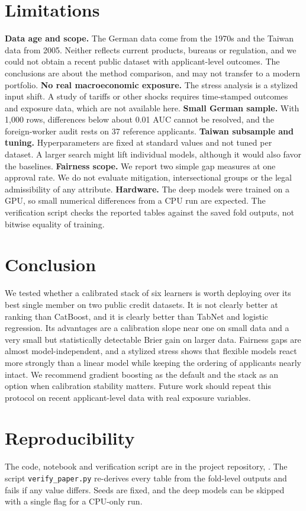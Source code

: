 \section{Limitations}\label{sec:limits}
\textbf{Data age and scope.} The German data come from the 1970s and the Taiwan data from 2005. Neither reflects current products, bureaus or regulation, and we could not obtain a recent public dataset with applicant-level outcomes. The conclusions are about the method comparison, and may not transfer to a modern portfolio.
\textbf{No real macroeconomic exposure.} The stress analysis is a stylized input shift. A study of tariffs or other shocks requires time-stamped outcomes and exposure data, which are not available here.
\textbf{Small German sample.} With 1{,}000 rows, differences below about 0.01 AUC cannot be resolved, and the foreign-worker audit rests on 37 reference applicants.
\textbf{Taiwan subsample and tuning.} Hyperparameters are fixed at standard values and not tuned per dataset. A larger search might lift individual models, although it would also favor the baselines.
\textbf{Fairness scope.} We report two simple gap measures at one approval rate. We do not evaluate mitigation, intersectional groups or the legal admissibility of any attribute.
\textbf{Hardware.} The deep models were trained on a GPU, so small numerical differences from a CPU run are expected. The verification script checks the reported tables against the saved fold outputs, not bitwise equality of training.

\section{Conclusion}
We tested whether a calibrated stack of six learners is worth deploying over its best single member on two public credit datasets. It is not clearly better at ranking than CatBoost, and it is clearly better than TabNet and logistic regression. Its advantages are a calibration slope near one on small data and a very small but statistically detectable Brier gain on larger data. Fairness gaps are almost model-independent, and a stylized stress shows that flexible models react more strongly than a linear model while keeping the ordering of applicants nearly intact. We recommend gradient boosting as the default and the stack as an option when calibration stability matters. Future work should repeat this protocol on recent applicant-level data with real exposure variables.

\section*{Reproducibility}
The code, notebook and verification script are in the project repository, \repourl. The script \texttt{verify\_paper.py} re-derives every table from the fold-level outputs and fails if any value differs. Seeds are fixed, and the deep models can be skipped with a single flag for a CPU-only run.

